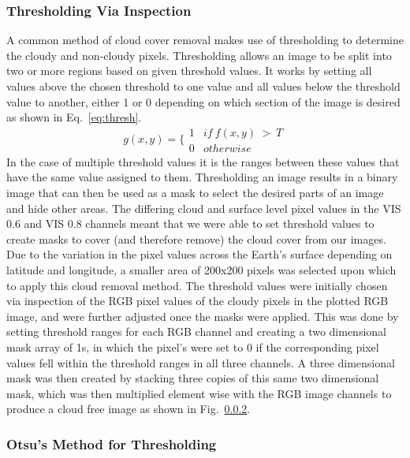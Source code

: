 \subsubsection{Thresholding Via Inspection}
 A common method of cloud cover removal makes use of thresholding to determine the cloudy and non-cloudy pixels. Thresholding allows an image to be split into two or more regions based on given threshold values. It works by setting all values above the chosen threshold to one value and all values below the threshold value to another, either 1 or 0 depending on which section of the image is desired as shown in Eq.~\ref{eq:thresh}.
 \begin{equation}\label{eq:thresh}
     g(x,y)=\Big\{\begin{matrix}
1 & if~f(x,y)~>~ T\\
0 & otherwise
\end{matrix}
 \end{equation}
 In the case of multiple threshold values it is the ranges between these values that have the same value assigned to them. Thresholding an image results in a binary image that can then be used as a mask to select the desired parts of an image and hide other areas. The differing cloud and surface level pixel values in the VIS 0.6 and VIS 0.8 channels meant that we were able to set threshold values to create masks to cover (and therefore remove) the cloud cover from our images. Due to the variation in the pixel values across the Earth's surface depending on latitude and longitude, a smaller area of 200x200 pixels was selected upon which to apply this cloud removal method. The threshold values were initially chosen via inspection of the RGB pixel values of the cloudy pixels in the plotted RGB image, and were further adjusted once the masks were applied. This was done by setting threshold ranges for each RGB channel and creating a two dimensional mask array of 1s,  in which the pixel's were set to 0 if the corresponding pixel values fell within the threshold ranges in all three channels. A three dimensional mask was then created by stacking three copies of this same two dimensional mask, which was then multiplied element wise with the RGB image channels to produce a cloud free image as shown in Fig.~\ref{}. 
 
\subsubsection{Otsu's Method for Thresholding}

